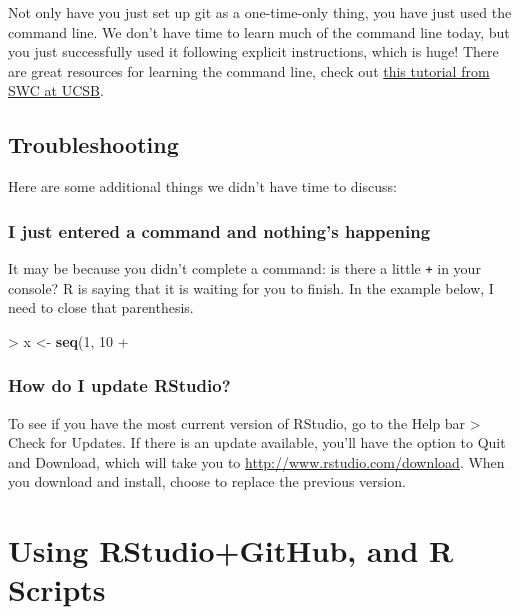 \documentclass[]{book}
\newenvironment{Shaded}{\begin{snugshade}}{\end{snugshade}}
\newcommand{\KeywordTok}[1]{\textcolor[rgb]{0.13,0.29,0.53}{\textbf{{#1}}}}
\newcommand{\DecValTok}[1]{\textcolor[rgb]{0.00,0.00,0.81}{{#1}}}
\newcommand{\StringTok}[1]{\textcolor[rgb]{0.31,0.60,0.02}{{#1}}}
\newcommand{\NormalTok}[1]{{#1}}
\theoremstyle{definition}
\theoremstyle{definition}
\theoremstyle{definition}
\theoremstyle{remark}
\begin{document}
Not only have you just set up git as a one-time-only thing, you have
just used the command line. We don't have time to learn much of the
command line today, but you just successfully used it following explicit
instructions, which is huge! There are great resources for learning the
command line, check out
\href{http://remi-daigle.github.io/2016-04-15-UCSB/shell/}{this tutorial
from SWC at UCSB}.

\section{Troubleshooting}\label{troubleshooting}

Here are some additional things we didn't have time to discuss:

\subsection{I just entered a command and nothing's
happening}\label{i-just-entered-a-command-and-nothings-happening}

It may be because you didn't complete a command: is there a little
\texttt{+} in your console? R is saying that it is waiting for you to
finish. In the example below, I need to close that parenthesis.

\begin{Shaded}
\begin{Highlighting}[]
\NormalTok{>}\StringTok{ }\NormalTok{x <-}\StringTok{ }\KeywordTok{seq}\NormalTok{(}\DecValTok{1}\NormalTok{, }\DecValTok{10}
\NormalTok{+}\StringTok{ }
\end{Highlighting}
\end{Shaded}

\subsection{How do I update RStudio?}\label{how-do-i-update-rstudio}

To see if you have the most current version of RStudio, go to the Help
bar \textgreater{} Check for Updates. If there is an update available,
you'll have the option to Quit and Download, which will take you to
\url{http://www.rstudio.com/download}. When you download and install,
choose to replace the previous version.

\chapter{Using RStudio+GitHub, and R Scripts}\label{rstudio-github}
\end{document}
